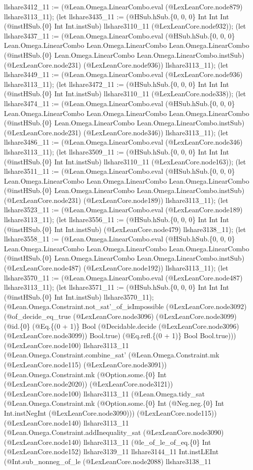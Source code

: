 \documentclass[11pt]{article}
\begin{document}
llshare3412\_11 := (@Lean.Omega.LinearCombo.eval (@LexLeanCore.node879) llshare3113\_11); (let llshare3435\_11 := (@HSub.hSub.\{0, 0, 0\} Int Int Int (@instHSub.\{0\} Int Int.instSub) llshare3110\_11 (@LexLeanCore.node932)); (let llshare3437\_11 := (@Lean.Omega.LinearCombo.eval (@HSub.hSub.\{0, 0, 0\} Lean.Omega.LinearCombo Lean.Omega.LinearCombo Lean.Omega.LinearCombo (@instHSub.\{0\} Lean.Omega.LinearCombo Lean.Omega.LinearCombo.instSub) (@LexLeanCore.node231) (@LexLeanCore.node936)) llshare3113\_11); (let llshare3449\_11 := (@Lean.Omega.LinearCombo.eval (@LexLeanCore.node936) llshare3113\_11); (let llshare3472\_11 := (@HSub.hSub.\{0, 0, 0\} Int Int Int (@instHSub.\{0\} Int Int.instSub) llshare3110\_11 (@LexLeanCore.node338)); (let llshare3474\_11 := (@Lean.Omega.LinearCombo.eval (@HSub.hSub.\{0, 0, 0\} Lean.Omega.LinearCombo Lean.Omega.LinearCombo Lean.Omega.LinearCombo (@instHSub.\{0\} Lean.Omega.LinearCombo Lean.Omega.LinearCombo.instSub) (@LexLeanCore.node231) (@LexLeanCore.node346)) llshare3113\_11); (let llshare3486\_11 := (@Lean.Omega.LinearCombo.eval (@LexLeanCore.node346) llshare3113\_11); (let llshare3509\_11 := (@HSub.hSub.\{0, 0, 0\} Int Int Int (@instHSub.\{0\} Int Int.instSub) llshare3110\_11 (@LexLeanCore.node163)); (let llshare3511\_11 := (@Lean.Omega.LinearCombo.eval (@HSub.hSub.\{0, 0, 0\} Lean.Omega.LinearCombo Lean.Omega.LinearCombo Lean.Omega.LinearCombo (@instHSub.\{0\} Lean.Omega.LinearCombo Lean.Omega.LinearCombo.instSub) (@LexLeanCore.node231) (@LexLeanCore.node189)) llshare3113\_11); (let llshare3523\_11 := (@Lean.Omega.LinearCombo.eval (@LexLeanCore.node189) llshare3113\_11); (let llshare3556\_11 := (@HSub.hSub.\{0, 0, 0\} Int Int Int (@instHSub.\{0\} Int Int.instSub) (@LexLeanCore.node479) llshare3138\_11); (let llshare3558\_11 := (@Lean.Omega.LinearCombo.eval (@HSub.hSub.\{0, 0, 0\} Lean.Omega.LinearCombo Lean.Omega.LinearCombo Lean.Omega.LinearCombo (@instHSub.\{0\} Lean.Omega.LinearCombo Lean.Omega.LinearCombo.instSub) (@LexLeanCore.node487) (@LexLeanCore.node192)) llshare3113\_11); (let llshare3570\_11 := (@Lean.Omega.LinearCombo.eval (@LexLeanCore.node487) llshare3113\_11); (let llshare3571\_11 := (@HSub.hSub.\{0, 0, 0\} Int Int Int (@instHSub.\{0\} Int Int.instSub) llshare3570\_11); (@Lean.Omega.Constraint.not\_sat'\_of\_isImpossible (@LexLeanCore.node3092) (@of\_decide\_eq\_true (@LexLeanCore.node3096) (@LexLeanCore.node3099) (@id.\{0\} (@Eq.\{(0 + 1)\} Bool (@Decidable.decide (@LexLeanCore.node3096) (@LexLeanCore.node3099)) Bool.true) (@Eq.refl.\{(0 + 1)\} Bool Bool.true))) (@LexLeanCore.node100) llshare3113\_11 (@Lean.Omega.Constraint.combine\_sat' (@Lean.Omega.Constraint.mk (@LexLeanCore.node115) (@LexLeanCore.node3091)) (@Lean.Omega.Constraint.mk (@Option.some.\{0\} Int (@LexLeanCore.node2020)) (@LexLeanCore.node3121)) (@LexLeanCore.node100) llshare3113\_11 (@Lean.Omega.tidy\_sat (@Lean.Omega.Constraint.mk (@Option.some.\{0\} Int (@Neg.neg.\{0\} Int Int.instNegInt (@LexLeanCore.node3090))) (@LexLeanCore.node115)) (@LexLeanCore.node140) llshare3113\_11 (@Lean.Omega.Constraint.addInequality\_sat (@LexLeanCore.node3090) (@LexLeanCore.node140) llshare3113\_11 (@le\_of\_le\_of\_eq.\{0\} Int (@LexLeanCore.node152) llshare3139\_11 llshare3144\_11 Int.instLEInt (@Int.sub\_nonneg\_of\_le (@LexLeanCore.node2088) llshare3138\_11 
\end{document}

